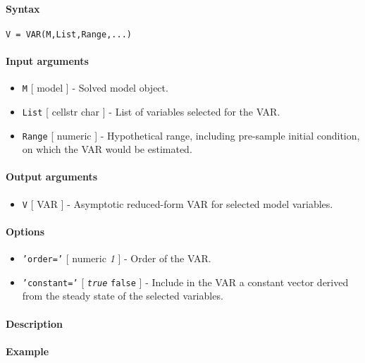 


	\paragraph{Syntax}

\begin{verbatim}
V = VAR(M,List,Range,...)
\end{verbatim}

\paragraph{Input arguments}

\begin{itemize}
\item
  \texttt{M} {[} model {]} - Solved model object.
\item
  \texttt{List} {[} cellstr \textbar{} char {]} - List of variables
  selected for the VAR.
\item
  \texttt{Range} {[} numeric {]} - Hypothetical range, including
  pre-sample initial condition, on which the VAR would be estimated.
\end{itemize}

\paragraph{Output arguments}

\begin{itemize}
\itemsep1pt\parskip0pt
\item
  \texttt{V} {[} VAR {]} - Asymptotic reduced-form VAR for selected
  model variables.
\end{itemize}

\paragraph{Options}

\begin{itemize}
\item
  \texttt{'order='} {[} numeric \textbar{} \emph{1} {]} - Order of the
  VAR.
\item
  \texttt{'constant='} {[} \emph{\texttt{true}} \textbar{}
  \texttt{false} {]} - Include in the VAR a constant vector derived from
  the steady state of the selected variables.
\end{itemize}

\paragraph{Description}

\paragraph{Example}


